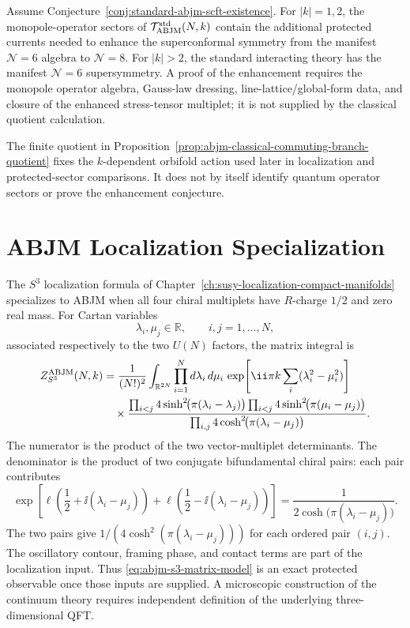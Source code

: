 \begin{conjecture}
\label{conj:abjm-monopole-n8-enhancement}
Assume Conjecture~\ref{conj:standard-abjm-scft-existence}.  For
\(|k|=1,2\), the monopole-operator sectors of
\(\mathcal T_{\rm ABJM}^{\rm std}(N,k)\) contain the additional protected
currents needed to enhance the superconformal symmetry from the manifest
\(\mathcal N=6\) algebra to \(\mathcal N=8\).  For \(|k|>2\), the standard
interacting theory has the manifest \(\mathcal N=6\) supersymmetry.  A proof
of the enhancement requires the monopole operator algebra, Gauss-law dressing,
line-lattice/global-form data, and closure of the enhanced stress-tensor
multiplet; it is not supplied by the classical quotient calculation.
\end{conjecture}

The finite quotient in Proposition~\ref{prop:abjm-classical-commuting-branch-quotient}
fixes the \(k\)-dependent orbifold action used later in localization and
protected-sector comparisons.  It does not by itself identify quantum operator
sectors or prove the enhancement conjecture.

\section{ABJM Localization Specialization}
\label{sec:abjm-localization-specialization}

The \(S^3\) localization formula of
Chapter~\ref{ch:susy-localization-compact-manifolds} specializes to ABJM
when all four chiral multiplets have \(R\)-charge \(1/2\) and zero real mass.
For Cartan variables
\[
  \lambda_i,\mu_j\in\mathbb R,\qquad i,j=1,\ldots,N,
\]
associated respectively to the two \(U(N)\) factors, the matrix integral is
\begin{equation}
\begin{aligned}
  Z^{\rm ABJM}_{S^3}(N,k)
  &=
  \frac1{(N!)^2}
  \int_{\mathbb R^{2N}}
  \prod_{i=1}^N d\lambda_i\,d\mu_i\,
  \exp\!\left[
    \ii\pi k\sum_i(\lambda_i^2-\mu_i^2)
  \right] \\
  &\quad\times
  \frac{
    \prod_{i<j}4\sinh^2\!\bigl(\pi(\lambda_i-\lambda_j)\bigr)
    \prod_{i<j}4\sinh^2\!\bigl(\pi(\mu_i-\mu_j)\bigr)
  }{
    \prod_{i,j}4\cosh^2\!\bigl(\pi(\lambda_i-\mu_j)\bigr)
  } .
\end{aligned}
  \label{eq:abjm-s3-matrix-model}
\end{equation}
The numerator is the product of the two vector-multiplet determinants.  The
denominator is the product of two conjugate bifundamental chiral pairs:
each pair contributes
\[
  \exp\!\left[
    \ell\!\left(\frac12+\ii(\lambda_i-\mu_j)\right)
    +
    \ell\!\left(\frac12-\ii(\lambda_i-\mu_j)\right)
  \right]
  =
  \frac1{2\cosh\!\bigl(\pi(\lambda_i-\mu_j)\bigr)} .
\]
The two pairs give \(1/(4\cosh^2(\pi(\lambda_i-\mu_j)))\) for each ordered
pair \((i,j)\).  The oscillatory contour, framing phase, and contact terms
are part of the localization input.  Thus
\eqref{eq:abjm-s3-matrix-model} is an exact protected observable once those
inputs are supplied.  A microscopic construction of the continuum theory
requires independent definition of the underlying three-dimensional QFT.

